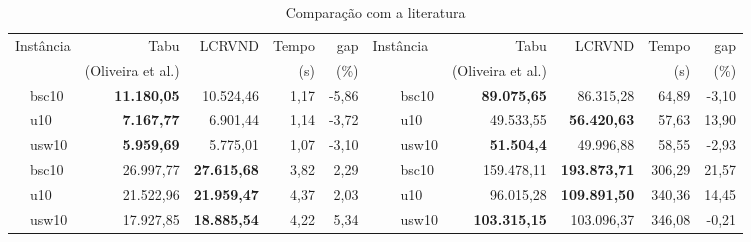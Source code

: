 \begin{table}[ht]
\setlength\extrarowheight{5pt}
\center
\caption{\small Comparação com a literatura \label{tab:lcrvnd_result}}
\setlength{\tabcolsep}{2pt}
\scriptsize
\hspace{-0.0cm}
\begin{tabular}{clrrrr|cclrrrr}
\hline
\hline
\multicolumn{2}{l}{Instância} & Tabu & LCRVND & Tempo & gap & \multicolumn{3}{l}{Instância} & Tabu & LCRVND & Tempo & gap \\
 &  & (Oliveira et al.) &  & (s) & (\%) &  &  &  & (Oliveira et al.) &  & (s) & (\%) \\
\hline
\parbox[t]{2mm}{} & bsc10 & \textbf{11.180,05} & 10.524,46 & 1,17 & -5,86 & \parbox[t]{2mm}{} & & bsc10 & \textbf{89.075,65} & 86.315,28 & 64,89 & -3,10\\
& u10 & \textbf{7.167,77} & 6.901,44 & 1,14 & -3,72 & & & u10 & 49.533,55 & \textbf{56.420,63} & 57,63 & 13,90\\
& usw10 & \textbf{5.959,69} & 5.775,01 & 1,07 & -3,10 & & & usw10 & \textbf{51.504,4} & 49.996,88 & 58,55 & -2,93\\
\hline
\parbox[t]{2mm}{} & bsc10 & 26.997,77 & \textbf{27.615,68} & 3,82 & 2,29 & \parbox[t]{2mm}{} && bsc10 & 159.478,11 & \textbf{193.873,71} & 306,29 & 21,57\\
& u10 & 21.522,96 & \textbf{21.959,47} & 4,37 & 2,03 & && u10 & 96.015,28 & \textbf{109.891,50} & 340,36 & 14,45\\
& usw10 & 17.927,85 & \textbf{18.885,54} & 4,22 & 5,34 && & usw10 & \textbf{103.315,15} & 103.096,37 & 346,08 & -0,21\\

\end{tabular}
\end{table}

